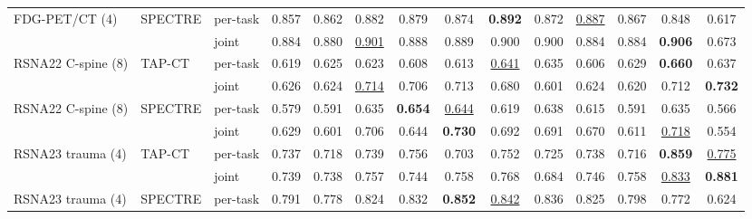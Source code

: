 \begin{tabular}{lllccccccccccc}
\addlinespace[2pt]
FDG-PET/CT (4) & SPECTRE & per-task & 0.857 & 0.862 & 0.882 & 0.879 & 0.874 & \textbf{0.892} & 0.872 & \cellcolor{modebest}\underline{0.887} & 0.867 & 0.848 & 0.617 \\
 &  & joint & \cellcolor{modebest}0.884 & \cellcolor{modebest}0.880 & \cellcolor{modebest}\underline{0.901} & \cellcolor{modebest}0.888 & \cellcolor{modebest}0.889 & \cellcolor{modebest}0.900 & \cellcolor{modebest}0.900 & 0.884 & \cellcolor{modebest}0.884 & \cellcolor{modebest}\textbf{0.906} & \cellcolor{modebest}0.673 \\
\addlinespace[2pt]
RSNA22 C-spine (8) & TAP-CT & per-task & 0.619 & \cellcolor{modebest}0.625 & 0.623 & 0.608 & 0.613 & \underline{0.641} & \cellcolor{modebest}0.635 & 0.606 & \cellcolor{modebest}0.629 & \textbf{0.660} & 0.637 \\
 &  & joint & \cellcolor{modebest}0.626 & 0.624 & \cellcolor{modebest}\underline{0.714} & \cellcolor{modebest}0.706 & \cellcolor{modebest}0.713 & \cellcolor{modebest}0.680 & 0.601 & \cellcolor{modebest}0.624 & 0.620 & \cellcolor{modebest}0.712 & \cellcolor{modebest}\textbf{0.732} \\
\addlinespace[2pt]
RSNA22 C-spine (8) & SPECTRE & per-task & 0.579 & 0.591 & 0.635 & \cellcolor{modebest}\textbf{0.654} & \underline{0.644} & 0.619 & 0.638 & 0.615 & 0.591 & 0.635 & \cellcolor{modebest}0.566 \\
 &  & joint & \cellcolor{modebest}0.629 & \cellcolor{modebest}0.601 & \cellcolor{modebest}0.706 & 0.644 & \cellcolor{modebest}\textbf{0.730} & \cellcolor{modebest}0.692 & \cellcolor{modebest}0.691 & \cellcolor{modebest}0.670 & \cellcolor{modebest}0.611 & \cellcolor{modebest}\underline{0.718} & 0.554 \\
\addlinespace[2pt]
RSNA23 trauma (4) & TAP-CT & per-task & 0.737 & 0.718 & 0.739 & \cellcolor{modebest}0.756 & 0.703 & 0.752 & \cellcolor{modebest}0.725 & 0.738 & 0.716 & \cellcolor{modebest}\textbf{0.859} & \underline{0.775} \\
 &  & joint & \cellcolor{modebest}0.739 & \cellcolor{modebest}0.738 & \cellcolor{modebest}0.757 & 0.744 & \cellcolor{modebest}0.758 & \cellcolor{modebest}0.768 & 0.684 & \cellcolor{modebest}0.746 & \cellcolor{modebest}0.758 & \underline{0.833} & \cellcolor{modebest}\textbf{0.881} \\
\addlinespace[2pt]
RSNA23 trauma (4) & SPECTRE & per-task & \cellcolor{modebest}0.791 & 0.778 & 0.824 & 0.832 & \textbf{0.852} & \cellcolor{modebest}\underline{0.842} & 0.836 & 0.825 & 0.798 & 0.772 & 0.624 \\

\end{tabular}
